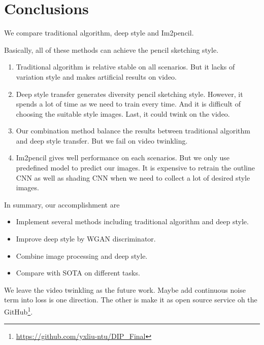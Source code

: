 \section{Conclusions}
We compare traditional algorithm, deep style and Im2pencil.

Basically, all of these methods can achieve the pencil sketching style.
\begin{enumerate}
  \item Traditional algorithm is relative stable on all scenarios. But it lacks of variation style and makes artificial results on video.
  \item Deep style transfer generates diversity pencil sketching style. However, it spends a lot of time as we need to train every time. And it is difficult of choosing the suitable style images. Last, it could twink on the video.
  \item Our combination method balance the results between traditional algorithm and deep style transfer. But we fail on video twinkling.
  \item Im2pencil gives well performance on each scenarios. But we only use predefined model to predict our images. It is expensive to retrain the outline CNN as well as shading CNN when we need to collect a lot of desired style images.
\end{enumerate}

In summary, our accomplishment are
\begin{itemize}
  \item Implement several methods including traditional algorithm and deep style.
  \item Improve deep style by WGAN discriminator.
  \item Combine image processing and deep style.
  \item Compare with SOTA on different tasks.
\end{itemize}
We leave the video twinkling as the future work. Maybe add continuous noise term into loss is one direction.
The other is make it as open source service oh the GitHub\footnote{\href{https://github.com/yxliu-ntu/DIP_Final}{https://github.com/yxliu-ntu/DIP\_Final}}.
